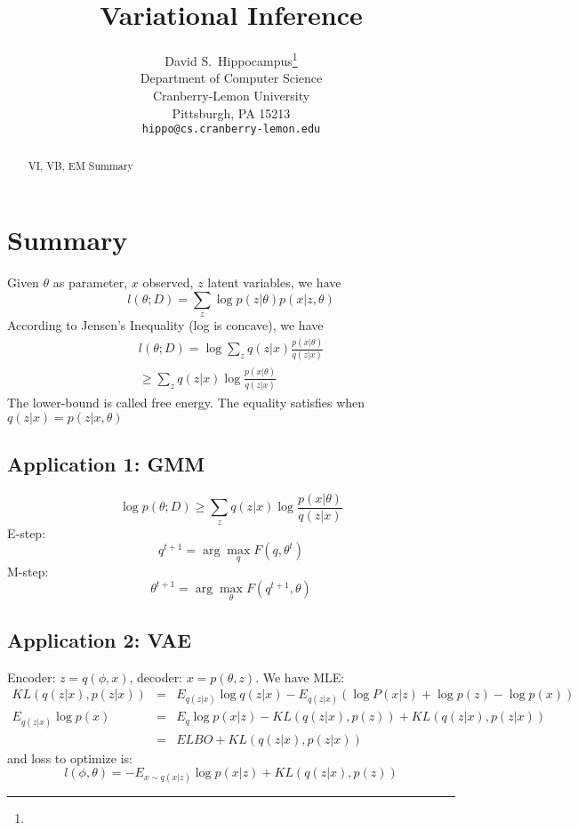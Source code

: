 \documentclass{article}
\title{Variational Inference}
\author{%
  David S.~Hippocampus\thanks{}\\%
  Department of Computer Science\\
  Cranberry-Lemon University\\
  Pittsburgh, PA 15213 \\
  \texttt{hippo@cs.cranberry-lemon.edu} \\
}
\begin{document}

\maketitle

\begin{abstract}
VI, VB, EM Summary
\end{abstract}

\section{Summary}
Given $\theta$ as parameter, $x$ observed, $z$ latent variables, we have
\begin{equation}
l(\theta; D) = \sum_z\log p(z|\theta) p(x|z, \theta)
\end{equation}
According to Jensen's Inequality (log is concave), we have
\begin{eqnarray}
l(\theta; D) =\log\sum_z q(z|x) \frac{p(x|\theta)}{q(z|x)}\\
\ge \sum_z q(z|x)  \log\frac{p(x|\theta)}{q(z|x)}
\end{eqnarray}
The lower-bound is called free energy. The equality satisfies when $q(z|x) = p(z|x,\theta)$

\subsection{Application 1: GMM}
\begin{equation}
\log p(\theta; D)\ge \sum_z q(z|x)  \log\frac{p(x|\theta)}{q(z|x)}
\end{equation}
E-step:
\begin{equation}
q^{t+1} = \arg\max_q F(q, \theta^t)
\end{equation}
M-step:
\begin{equation}
\theta^{t+1} = \arg\max_{\theta} F(q^{t+1}, \theta)
\end{equation}

\subsection{Application 2: VAE}
Encoder: $z = q(\phi,x)$, decoder: $x=p(\theta,z)$. We have MLE:
\begin{eqnarray}
KL(q(z|x), p(z|x)) & = & E_{q(z|x)}\log q(z|x) -  E_{q(z|x)}(\log P(x|z) + \log p(z) - \log p(x)) \\
E_{q(z|x)}\log p(x) &=& E_q \log p(x|z) - KL(q(z|x), p(z)) + KL(q(z|x), p(z|x))\\
 &=& ELBO + KL(q(z|x), p(z|x))
\end{eqnarray}
and loss to optimize is:
\begin{equation}
l(\phi, \theta) = -E_{x\sim q(x|z)} \log p(x|z) + KL(q(z|x), p(z))
\end{equation}
\end{document}
